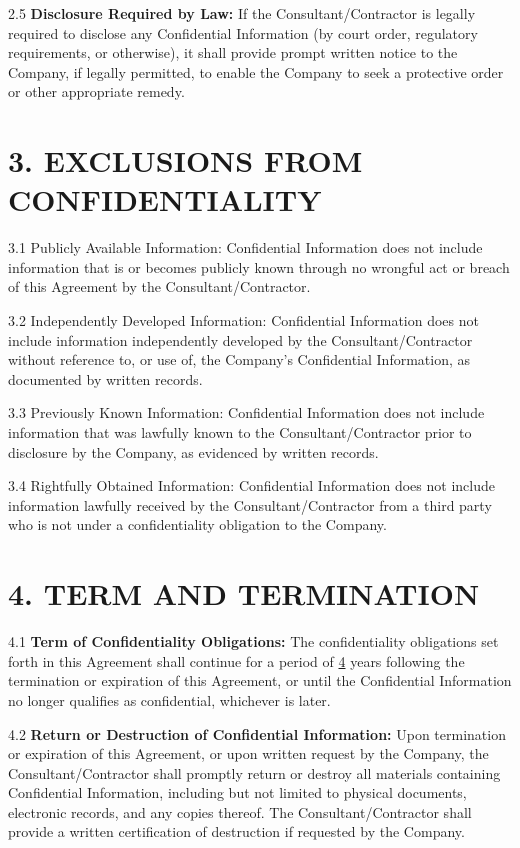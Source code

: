 \documentclass[12pt]{article}
\begin{document}
2.5 \textbf{Disclosure Required by Law:} If the Consultant/Contractor is legally required to disclose any Confidential Information (by court order, regulatory requirements, or otherwise), it shall provide prompt written notice to the Company, if legally permitted, to enable the Company to seek a protective order or other appropriate remedy.

\section*{3. EXCLUSIONS FROM CONFIDENTIALITY}

3.1 Publicly Available Information: Confidential Information does not include information that is or becomes publicly known through no wrongful act or breach of this Agreement by the Consultant/Contractor.

3.2 Independently Developed Information: Confidential Information does not include information independently developed by the Consultant/Contractor without reference to, or use of, the Company's Confidential Information, as documented by written records.

3.3 Previously Known Information: Confidential Information does not include information that was lawfully known to the Consultant/Contractor prior to disclosure by the Company, as evidenced by written records.

3.4 Rightfully Obtained Information: Confidential Information does not include information lawfully received by the Consultant/Contractor from a third party who is not under a confidentiality obligation to the Company.

\section*{4. TERM AND TERMINATION}

4.1 \textbf{Term of Confidentiality Obligations:} The confidentiality obligations set forth in this Agreement shall continue for a period of \underline{4} years following the termination or expiration of this Agreement, or until the Confidential Information no longer qualifies as confidential, whichever is later.

4.2 \textbf{Return or Destruction of Confidential Information:} Upon termination or expiration of this Agreement, or upon written request by the Company, the Consultant/Contractor shall promptly return or destroy all materials containing Confidential Information, including but not limited to physical documents, electronic records, and any copies thereof. The Consultant/Contractor shall provide a written certification of destruction if requested by the Company.
\end{document}
